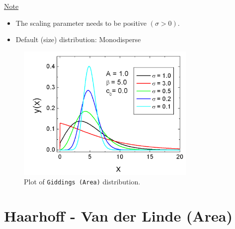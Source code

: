 \underline{Note}
\begin{itemize}
  \item The scaling parameter needs to be positive $(\sigma > 0)$.
  \item Default (size) distribution: Monodisperse
\end{itemize}

\begin{figure}[htb]
\begin{center}
\includegraphics[width=0.768\textwidth]{GiddingsArea.png}
\end{center}
\caption{Plot of \texttt{Giddings (Area)} distribution.}
\label{fig:GiddingsArea}
\end{figure}

\clearpage
\section{Haarhoff - Van der Linde (Area)} ~\\
\label{sec:HaarhoffVanderLindeArea}

